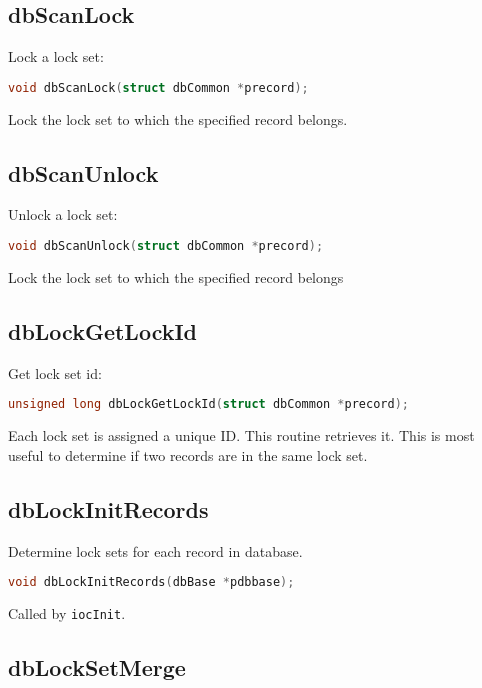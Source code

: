\subsection{dbScanLock}

Lock a lock set:

\begin{lstlisting}[language=C]
void dbScanLock(struct dbCommon *precord);
\end{lstlisting}

Lock the lock set to which the specified record belongs.

\subsection{dbScanUnlock}

Unlock a lock set:

\begin{lstlisting}[language=C]
void dbScanUnlock(struct dbCommon *precord);
\end{lstlisting}

Lock the lock set to which the specified record belongs

\subsection{dbLockGetLockId}

Get lock set id:

\begin{lstlisting}[language=C]
unsigned long dbLockGetLockId(struct dbCommon *precord);
\end{lstlisting}

Each lock set is assigned a unique ID.
This routine retrieves it.
This is most useful to determine if two records are in the same lock set.

\subsection{dbLockInitRecords}

Determine lock sets for each record in database.

\begin{lstlisting}[language=C]
void dbLockInitRecords(dbBase *pdbbase);
\end{lstlisting}

Called by \verb|iocInit|.

\subsection{dbLockSetMerge}

